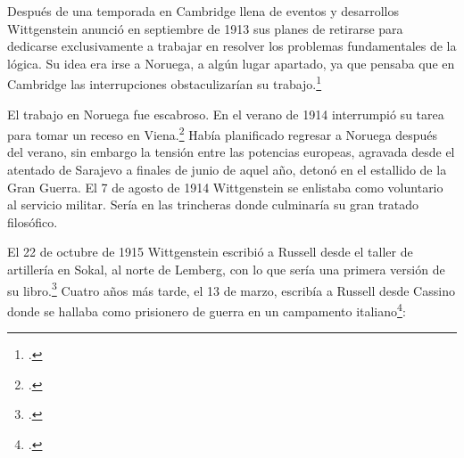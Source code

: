     Después de una temporada en Cambridge llena de eventos y desarrollos
    Wittgenstein anunció en septiembre de 1913 sus planes de retirarse para
    dedicarse exclusivamente a trabajar en resolver los problemas fundamentales de
    la lógica. Su idea era irse a Noruega, a algún lugar apartado, ya que pensaba
    que en Cambridge las interrupciones obstaculizarían su trabajo.\footcite[cap. 4
    loc 1844]{monk} 

    El trabajo en Noruega fue escabroso. En el verano de 1914 interrumpió su tarea
    para tomar un receso en Viena.\footcite[cap. 5 loc 2154]{monk} Había planificado
    regresar a Noruega después del verano, sin embargo la tensión entre las
    potencias europeas, agravada desde el atentado de Sarajevo a finales de junio de
    aquel año, detonó en el estallido de la Gran Guerra. El 7 de agosto de 1914
    Wittgenstein se enlistaba como voluntario al servicio militar. Sería en las
    trincheras donde culminaría su gran tratado filosófico.

    El 22 de octubre de 1915 Wittgenstein escribió a Russell desde el taller de
    artillería en Sokal, al norte de Lemberg, con lo que sería una primera versión
    de su libro.\footcite[cf. p.84]{cambridgeletters} Cuatro años más tarde, el 13
    de marzo, escribía a Russell desde Cassino donde se hallaba como prisionero de
    guerra en un campamento italiano\footcite[cf. p.268]{mcguinness}: 

